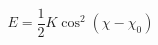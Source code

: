 \documentclass[12pt]{article}
\begin{document}
$$
  E = \frac{1}{2} K \cos^2{\left(\chi - \chi_0\right)}
$$
\end{document}
